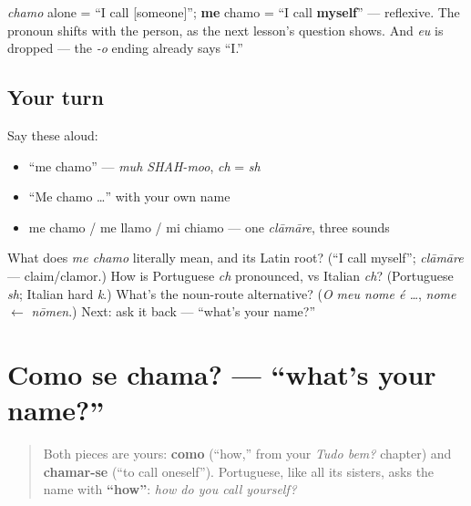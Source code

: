 \begin{grammarlens}[title={Grammar Lens: the reflexive}]
\emph{chamo} alone = \textquotedblleft{}I call {[}someone{]}\textquotedblright{}; \textbf{me} chamo = \textquotedblleft{}I call \textbf{myself}\textquotedblright{} — reflexive. The pronoun shifts with the person, as the next lesson's question shows. And \emph{eu} is dropped — the \emph{-o} ending already says \textquotedblleft{}I.\textquotedblright{}
\end{grammarlens}

\subsection*{Your turn}
Say these aloud:

\begin{itemize}
\raggedright
  \item \textquotedblleft{}me chamo\textquotedblright{} — \emph{muh SHAH-moo}, \emph{ch} = \emph{sh}
  \item \textquotedblleft{}Me chamo …\textquotedblright{} with your own name
  \item me chamo / me llamo / mi chiamo — one \emph{clāmāre}, three sounds
\end{itemize}

\begin{tcolorbox}[breakable,colback=teal!4,colframe=teal!35!black,title={Before you move on}]
What does \emph{me chamo} literally mean, and its Latin root? (\textquotedblleft{}I call myself\textquotedblright{}; \emph{clāmāre} — claim/clamor.) How is Portuguese \emph{ch} pronounced, vs Italian \emph{ch}? (Portuguese \emph{sh}; Italian hard \emph{k}.) What's the noun-route alternative? (\emph{O meu nome é …}, \emph{nome} $\leftarrow$ \emph{nōmen}.) Next: ask it back — \textquotedblleft{}what's your name?\textquotedblright{}
\end{tcolorbox}
\section[Como se chama?]{Como se chama? — \textquotedblleft{}what's your name?\textquotedblright{}}

\label{lesson:PT-C03-como-se-chama}



\begin{quote}
Both pieces are yours: \textbf{como} (\textquotedblleft{}how,\textquotedblright{} from your \emph{Tudo bem?} chapter) and \textbf{chamar-se} (\textquotedblleft{}to call oneself\textquotedblright{}). Portuguese, like all its sisters, asks the name with \textbf{\textquotedblleft{}how\textquotedblright{}}: \emph{how do you call yourself?}
\end{quote}

